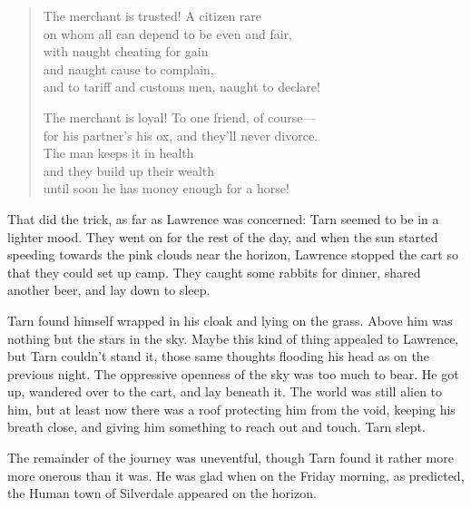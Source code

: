 \begin{verse}
The merchant is trusted!  A citizen rare\\
on whom all can depend to be even and fair,\\
\hspace{2em}with naught cheating for gain\\
\hspace{2em}and naught cause to complain,\\
and to tariff and customs men, naught to declare!

The merchant is loyal!  To one friend, of course---\\
for his partner's his ox, and they'll never divorce.\\
\hspace{2em}The man keeps it in health\\
\hspace{2em}and they build up their wealth\\
until soon he has money enough for a horse!
\end{verse}

That did the trick, as far as Lawrence was concerned: Tarn seemed to be in a lighter mood.  They went on for the rest of the day, and when the sun started speeding towards the pink clouds near the horizon, Lawrence stopped the cart so that they could set up camp.  They caught some rabbits for dinner, shared another beer, and lay down to sleep.

Tarn found himself wrapped in his cloak and lying on the grass.  Above him was nothing but the stars in the sky.  Maybe this kind of thing appealed to Lawrence, but Tarn couldn't stand it, those same thoughts flooding his head as on the previous night.  The oppressive openness of the sky was too much to bear.  He got up, wandered over to the cart, and lay beneath it.  The world was still alien to him, but at least now there was a roof protecting him from the void, keeping his breath close, and giving him something to reach out and touch.  Tarn slept.

The remainder of the journey was uneventful, though Tarn found it rather more more onerous than it was.  He was glad when on the Friday morning, as predicted, the Human town of Silverdale appeared on the horizon.